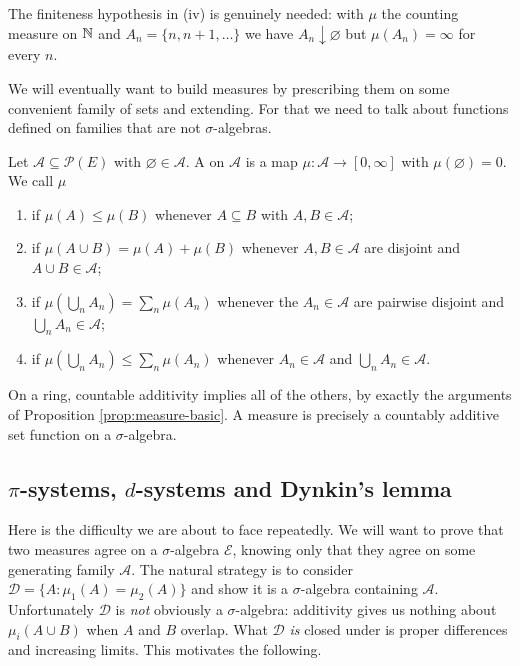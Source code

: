 \documentclass[a4paper]{scrartcl}
\newcommand{\cA}{\mathcal{A}}
\newcommand{\cD}{\mathcal{D}}
\newcommand{\cE}{\mathcal{E}}
\begin{document}
The finiteness hypothesis in (iv) is genuinely needed: with $\mu$ the counting measure on $\mathbb{N}$ and $A_n = \{n, n+1, \dots\}$ we have $A_n \downarrow \varnothing$ but $\mu(A_n) = \infty$ for every $n$.

We will eventually want to build measures by prescribing them on some convenient family of sets and extending. For that we need to talk about functions defined on families that are not $\sigma$-algebras.

\begin{definition}
	Let $\cA \subseteq \mathcal{P}(E)$ with $\varnothing \in \cA$. A  on $\cA$ is a map $\mu : \cA \to [0,\infty]$ with $\mu(\varnothing) = 0$. We call $\mu$
	\begin{enumerate}[label=(\roman*)]
		\item {} if $\mu(A) \leq \mu(B)$ whenever $A \subseteq B$ with $A, B \in \cA$;
		\item {} if $\mu(A \cup B) = \mu(A) + \mu(B)$ whenever $A, B \in \cA$ are disjoint and $A \cup B \in \cA$;
		\item {} if $\mu(\bigcup_n A_n) = \sum_n \mu(A_n)$ whenever the $A_n \in \cA$ are pairwise disjoint and $\bigcup_n A_n \in \cA$;
		\item {} if $\mu(\bigcup_n A_n) \leq \sum_n \mu(A_n)$ whenever $A_n \in \cA$ and $\bigcup_n A_n \in \cA$.
	\end{enumerate}
\end{definition}

On a ring, countable additivity implies all of the others, by exactly the arguments of Proposition \ref{prop:measure-basic}. A measure is precisely a countably additive set function on a $\sigma$-algebra.

\subsection{\texorpdfstring{$\pi$}{pi}-systems, \texorpdfstring{$d$}{d}-systems and Dynkin's lemma}

Here is the difficulty we are about to face repeatedly. We will want to prove that two measures agree on a $\sigma$-algebra $\cE$, knowing only that they agree on some generating family $\cA$. The natural strategy is to consider $\cD = \{A : \mu_1(A) = \mu_2(A)\}$ and show it is a $\sigma$-algebra containing $\cA$. Unfortunately $\cD$ is \emph{not} obviously a $\sigma$-algebra: additivity gives us nothing about $\mu_i(A \cup B)$ when $A$ and $B$ overlap. What $\cD$ \emph{is} closed under is proper differences and increasing limits. This motivates the following.
\end{document}
